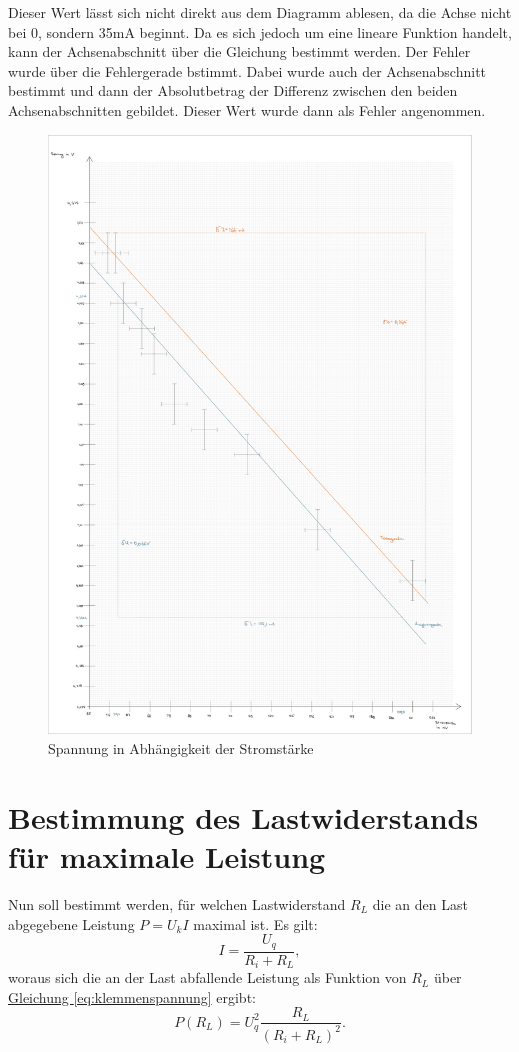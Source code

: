 Dieser Wert lässt sich nicht direkt aus dem Diagramm ablesen, da die Achse nicht bei 0, sondern 35mA beginnt. Da es sich jedoch um eine lineare Funktion handelt, kann der Achsenabschnitt über die Gleichung bestimmt werden. 
Der Fehler wurde über die Fehlergerade bstimmt. Dabei wurde auch der Achsenabschnitt bestimmt und dann der Absolutbetrag der Differenz zwischen den beiden Achsenabschnitten gebildet. Dieser Wert wurde dann als Fehler angenommen.

\onecolumn
\begin{figure}[h]
    \centering
    \includegraphics[width=1\textwidth]{img/23/plot-23-Strommessung.pdf}
    \caption{Spannung in Abhängigkeit der Stromstärke}
    \label{fig:u_i_diagramm}
\end{figure}
\twocolumn


\section{Bestimmung des Lastwiderstands für maximale Leistung}
Nun soll bestimmt werden, für welchen Lastwiderstand \(R_L\) die an den Last abgegebene
Leistung \(P=U_k I\) maximal ist. Es gilt:
\begin{equation}
    I=\frac{U_q}{R_i+R_L},
\end{equation}
woraus sich die an der Last abfallende Leistung als Funktion von \(R_L\) über \hyperref[eq:klemmenspannung]{Gleichung \ref*{eq:klemmenspannung}} ergibt:
\begin{equation}
    P(R_L)=U_q^2\frac{R_L}{(R_i+R_L)^2}.
\end{equation}

